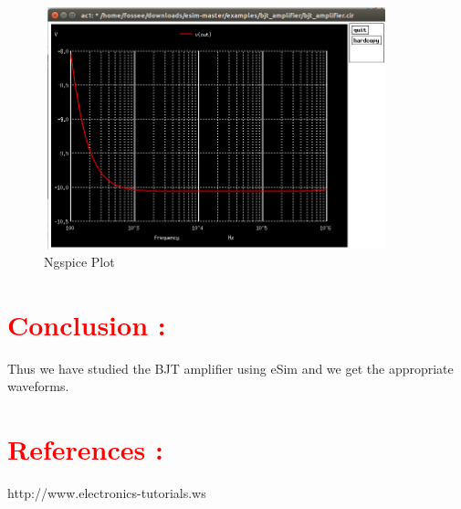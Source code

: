 \documentclass{article}
\begin{document}
\begin{figure}[!htp]
        \centering
        \includegraphics[width=10cm, height=7cm]{ngspice-plot-output.png}
        \caption{Ngspice Plot}
        \label{Ngspice-Plot}
\end{figure}


\section*{\textcolor{red}{Conclusion :}}

Thus we have studied the BJT amplifier using eSim and we get the appropriate waveforms.


\section*{\textcolor{red}{References :}}

http://www.electronics-tutorials.ws
\end{document}
